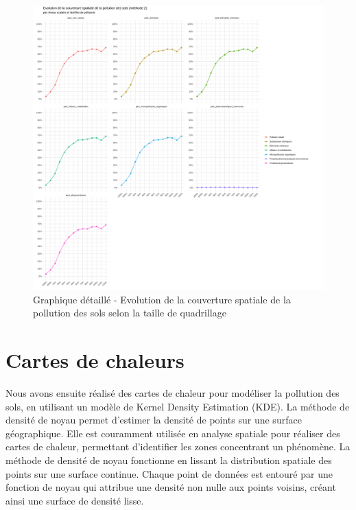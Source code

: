 \documentclass[a4paper,twoside,12pt]{book}
\begin{document}
\clearpage
\vspace*{2cm}
\begin{figure}[!h] 
\centering  
\includegraphics[width=1.3\textwidth]{img/chapitre4/Methode2_Graph_Evo_couv_spa_pol_sols_6groupes_facettes.png} 
\caption{Graphique détaillé - Evolution de la couverture spatiale de la pollution des sols selon la taille de quadrillage} 
\label{fig:graph_carroyages}
\end{figure} 



\section{Cartes de chaleurs}

Nous avons ensuite réalisé des cartes de chaleur pour modéliser la pollution des sols, en utilisant un modèle de Kernel Density Estimation (KDE). La méthode de densité de noyau permet d'estimer la densité de points sur une surface géographique. Elle est couramment utilisée en analyse spatiale pour réaliser des cartes de chaleur, permettant d'identifier les zones concentrant un phénomène. La méthode de densité de noyau fonctionne en lissant la distribution spatiale des points sur une surface continue. Chaque point de données est entouré par une fonction de noyau qui attribue une densité non nulle aux points voisins, créant ainsi une surface de densité lisse.
\end{document}
